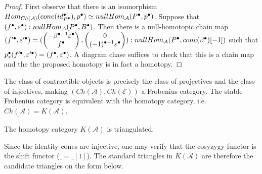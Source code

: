 \begin{proof}
        First observe that there is an isomorphism $Hom_{Ch(\mathcal{A})}(cone(id_{P^{\bullet}}^{\bullet}),p^{\bullet})\simeq nullHom_{\mathcal{A}}(P^{\bullet},p^{\bullet})$. Suppose that $(f^{\bullet},\varepsilon^{\bullet}):nullHom_{\mathcal{A}}(P^{\bullet},B^{\bullet})$. Then there is a null-homotopic chain map $(f'^{\bullet},\varepsilon '^{\bullet})=(\begin{pmatrix} -\beta^{\bullet - 1}\varepsilon^{\bullet} \\ f^{\bullet} \end{pmatrix}, \begin{pmatrix} 0 \\ (-1)^{\bullet + 1}\varepsilon^{\bullet} \end{pmatrix}):nullHom_{\mathcal{A}}(P^{\bullet},cone(\beta^{\bullet})[-1])$ such that \\$p^{\bullet}_*(f'^{\bullet},\varepsilon '^{\bullet})=(f^{\bullet},\varepsilon^{\bullet})$. A diagram chase suffices to check that this is a chain map and the the proposed homotopy is in fact a homotopy.
    \end{proof}

    \begin{corollary}
        The class of contractible objects is precisely the class of projectives and the class of injectives, making $(Ch(\mathcal{A}),Ch(\mathcal{E}))$ a Frobenius category. The stable Frobenius category is equivalent with the homotopy category, i.e. $\underline{Ch(\mathcal{A})}=K(\mathcal{A})$. 
    \end{corollary}

    \begin{corollary}
        The homotopy category $K(\mathcal{A})$ is triangulated.
    \end{corollary}

    Since the identity cones are injective, one may verify that the cosyzygy functor is the shift functor (\upside{$\Omega$}$\_=\_[1]$). The standard triangles in $K(\mathcal{A})$ are therefore the candidate triangles on the form below.
    \begin{center}
    \end{center}

